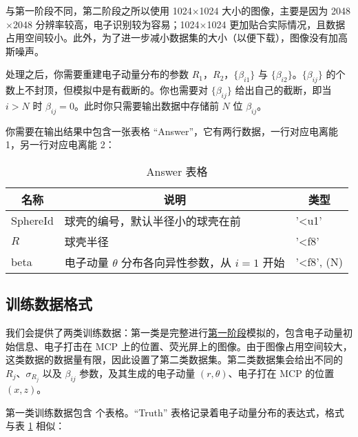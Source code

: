 \documentclass{article}
\begin{document}
与第一阶段不同，第二阶段之所以使用 1024$\times$1024 大小的图像，主要是因为 2048$\times$2048 分辨率较高，电子识别较为容易；1024$\times$1024 更加贴合实际情况，且数据占用空间较小。此外，为了进一步减小数据集的大小（以便下载），图像没有加高斯噪声。

处理之后，你需要重建电子动量分布的参数 $R_1$，$R_2$，$\{\beta_{i1}\}$ 与 $\{\beta_{i2}\}$。$\{\beta_{ij}\}$ 的个数上不封顶，但模拟中是有截断的。你也需要对 $\{\beta_{ij}\}$ 给出自己的截断，即当 $i>N$ 时 $\beta_{ij} = 0$。此时你只需要输出数据中存储前 $N$ 位 $\beta_{ij}$。

你需要在输出结果中包含一张表格 “Answer”，它有两行数据，一行对应电离能 1，另一行对应电离能 2：

\begin{table}[H]
    \caption{Answer 表格}
        \label{tab:Answer}
        \centering
        {
            \begin{tabular}[c]{l|l|l}
                \hline
                \multicolumn{1}{c|}{\textbf{名称}} & 
                \multicolumn{1}{c|}{\textbf{说明}} & 
                \multicolumn{1}{c}{\textbf{类型}} \\
                \hline
                SphereId & 球壳的编号，默认半径小的球壳在前 & '<u1' \\
                $R$ & 球壳半径 & '<f8' \\
                beta& 电子动量 $\theta$ 分布各向异性参数，从 $i=1$ 开始 & '<f8', (N) \\
                \hline
            \end{tabular}
        }
\end{table}


\subsection{训练数据格式} %
\label{sub:训练数据格式}

我们会提供了两类训练数据：第一类是完整进行\href{https://github.com/physics-data/tpl_SEVI}{第一阶段}模拟的，包含电子动量初始信息、电子打击在 MCP 上的位置、荧光屏上的图像。由于图像占用空间较大，这类数据的数据量有限，因此设置了第二类数据集。第二类数据集会给出不同的 $R_j$、$\sigma_{R_j}$ 以及 $\beta_{ij}$ 参数，及其生成的电子动量 $(r,\theta)$、电子打在 MCP 的位置 $(x,z)$。

第一类训练数据包含 个表格。“Truth” 表格记录着电子动量分布的表达式，格式与表 \ref{tab:Answer} 相似：
\end{document}

